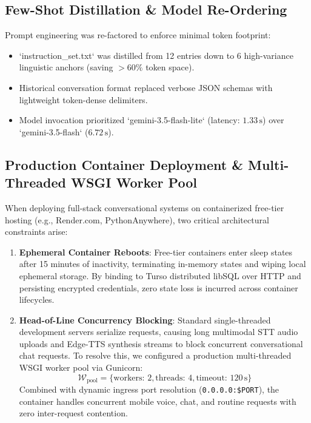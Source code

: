 \documentclass[conference]{IEEEtran}
\begin{document}
\subsection{Few-Shot Distillation \& Model Re-Ordering}
Prompt engineering was re-factored to enforce minimal token footprint:
\begin{itemize}
    \item `instruction_set.txt` was distilled from 12 entries down to 6 high-variance linguistic anchors (saving $>60\%$ token space).
    \item Historical conversation format replaced verbose JSON schemas with lightweight token-dense delimiters.
    \item Model invocation prioritized `gemini-3.5-flash-lite` (latency: $1.33\,\text{s}$) over `gemini-3.5-flash` ($6.72\,\text{s}$).
\end{itemize}

\subsection{Production Container Deployment \& Multi-Threaded WSGI Worker Pool}
When deploying full-stack conversational systems on containerized free-tier hosting (e.g., Render.com, PythonAnywhere), two critical architectural constraints arise:
\begin{enumerate}
    \item \textbf{Ephemeral Container Reboots}: Free-tier containers enter sleep states after 15 minutes of inactivity, terminating in-memory states and wiping local ephemeral storage. By binding to Turso distributed libSQL over HTTP and persisting encrypted credentials, zero state loss is incurred across container lifecycles.
    \item \textbf{Head-of-Line Concurrency Blocking}: Standard single-threaded development servers serialize requests, causing long multimodal STT audio uploads and Edge-TTS synthesis streams to block concurrent conversational chat requests. To resolve this, we configured a production multi-threaded WSGI worker pool via Gunicorn:
    \begin{equation}
    \mathcal{W}_{\text{pool}} = \{ \text{workers: } 2, \text{threads: } 4, \text{timeout: } 120\,\text{s} \}
    \end{equation}
    Combined with dynamic ingress port resolution (\texttt{0.0.0.0:\$PORT}), the container handles concurrent mobile voice, chat, and routine requests with zero inter-request contention.
\end{enumerate}
\end{document}
